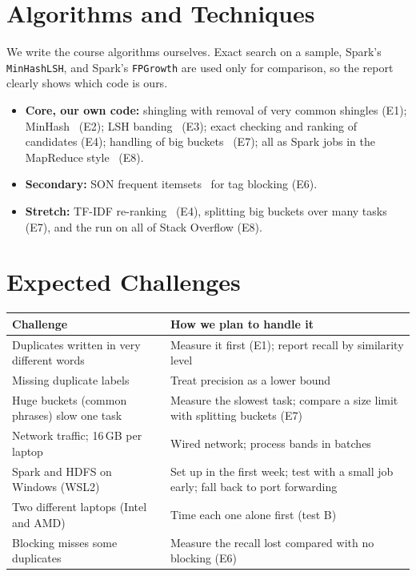\documentclass[11pt,a4paper]{article}
\begin{document}
\section{Algorithms and Techniques}

We write the course algorithms ourselves. Exact search on a sample, Spark's
\texttt{MinHashLSH}, and Spark's \texttt{FPGrowth} are used only for comparison,
so the report clearly shows which code is ours.
\begin{itemize}
  \item \textbf{Core, our own code:} shingling with removal of very common
        shingles (E1); MinHash~\cite{broder1997} (E2); LSH
        banding~\cite{indyk1998} (E3); exact checking and ranking of candidates
        (E4); handling of big buckets~\cite{kwon2012} (E7); all as Spark jobs in
        the MapReduce style~\cite{dean2004} (E8).
  \item \textbf{Secondary:} SON frequent itemsets~\cite{son1995} for tag
        blocking (E6).
  \item \textbf{Stretch:} TF-IDF re-ranking~\cite{mmds} (E4), splitting big
        buckets over many tasks (E7), and the run on all of Stack Overflow (E8).
\end{itemize}

\section{Expected Challenges}
{\small
\begin{tabularx}{\textwidth}{@{}>{\raggedright\arraybackslash}p{6.6cm} Y@{}}
\toprule
\textbf{Challenge} & \textbf{How we plan to handle it} \\
\midrule
Duplicates written in very different words & Measure it first (E1); report recall by similarity level \\
Missing duplicate labels & Treat precision as a lower bound \\
Huge buckets (common phrases) slow one task & Measure the slowest task; compare a size limit with splitting buckets (E7) \\
Network traffic; 16\,GB per laptop & Wired network; process bands in batches \\
Spark and HDFS on Windows (WSL2) & Set up in the first week; test with a small job early; fall back to port forwarding \\
Two different laptops (Intel and AMD) & Time each one alone first (test B) \\
Blocking misses some duplicates & Measure the recall lost compared with no blocking (E6) \\
\bottomrule
\end{tabularx}}
\end{document}
